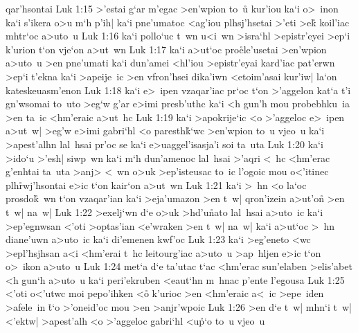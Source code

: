 qar'hsontai\bibvsend
\vs Luk 1:15
>'estai
g`ar
m'egac
>en'wpion
to~u\r{}
kur'iou
ka`i
o>~inon
ka`i
s'ikera
o>u
m`h
p'ih|
ka`i
pne'umatoc
<ag'iou
plhsj'hsetai
>'eti
>ek\r{}
koil'iac
mhtr`oc
a>uto~u\bibvsend
\vs Luk 1:16
ka`i
pollo`uc
t~wn
u<i~wn
>isra`hl
>epistr'eyei
>ep`i
k'urion
t`on
vje`on
a>ut~wn\bibvsend
\vs Luk 1:17
ka`i
a>ut`oc
pro\r{e}le'usetai
>en'wpion
a>uto~u
>en
pne'umati
ka`i
dun'amei
<hl'iou
>epistr'eyai
kard'iac
pat'erwn
>ep`i
t'ekna
ka`i
>apeije~ic
>en
vfron'hsei
dika'iwn
<etoim'asai
kur'iw|
la`on
kateskeuasm'enon\bibvsend
\vs Luk 1:18
ka`i
e>~ipen
vzaqar'iac
pr`oc
t`on
>'aggelon
kat`a
t'i
gn'wsomai
to~uto
>eg`w
g'ar
e>imi
presb'uthc
ka`i
<h
gun'h
mou
probebhku~ia
>en
ta~ic
<hm'eraic
a>ut~hc\bibvsend
\vs Luk 1:19
ka`i
>apokrije`ic
<o
>'aggeloc
e>~ipen
a>ut~w|
>eg'w
e>imi
gabri`hl
<o
paresth\r{k}`wc
>en'wpion
to~u
vjeo~u
ka`i
>apest'alhn
lal~hsai
pr'oc
se
ka`i
e>uaggel'isasja'i
soi
ta~uta\bibvsend
\vs Luk 1:20
ka`i
>ido`u
>'esh|
siwp~wn
ka`i
m`h
dun'amenoc
lal~hsai
>'aqri
<~hc
<hm'erac
g'enhtai
ta~uta
>anj>
<~wn
o>uk
>ep'isteusac
to~ic
l'ogoic
mou
o<'itinec
plh\r{r}wj'hsontai
e>ic
t`on
kair`on
a>ut~wn\bibvsend
\vs Luk 1:21
ka`i
>~hn
<o
la`oc
prosdo\r{k}~wn
t`on
vzaqar'ian
ka`i
>eja'umazon
>en
t~w|
qron'izein
a>ut'on\r{}
>en
t~w|
na~w|\bibvsend
\vs Luk 1:22
>exelj`wn
d`e
o>uk
>hd'u\r{n}ato
lal~hsai
a>uto~ic
ka`i
>ep'egnwsan
<'oti
>optas'ian
<e'wraken
>en
t~w|
na~w|
ka`i
a>ut`oc
>~hn
diane'uwn
a>uto~ic
ka`i
di'emenen
kwf'oc\bibvsend
\vs Luk 1:23
ka`i
>eg'eneto
<wc
>epl'hsjhsan
a<i
<hm'erai
t~hc
leitourg'iac
a>uto~u
>ap~hljen
e>ic
t`on
o>~ikon
a>uto~u\bibvsend
\vs Luk 1:24
met`a
d`e
ta'utac
t`ac
<hm'erac
sun'elaben
>elis'abet
<h
gun`h
a>uto~u
ka`i
peri'ekruben
<eaut`hn
m~hnac
p'ente
l'egousa\bibvsend
\vs Luk 1:25
<'oti
o<'utwc
moi
pepo'ihken
<o\r{}
k'urioc
>en
<hm'eraic
a<~ic
>epe~iden
>afele~in
\r{t}`o
>'oneid'oc
mou
>en
>anjr'wpoic\bibvsend
\vs Luk 1:26
>en
d`e
t~w|
mhn`i
t~w|
<'ektw|
>apest'alh
<o
>'aggeloc
gabri`hl
<u\r{p}`o
to~u
vjeo~u
